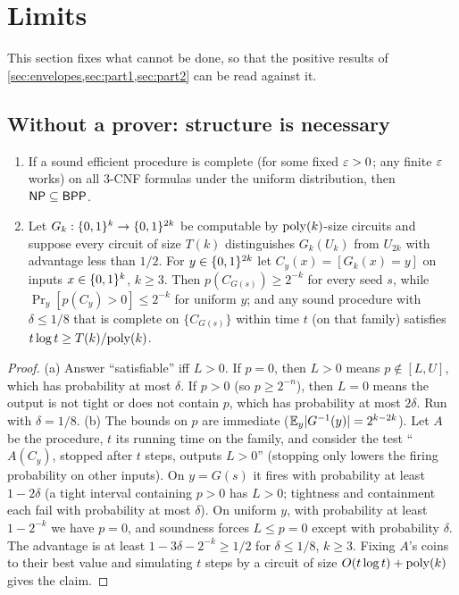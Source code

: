 \section{Limits}\label{sec:limits}

This section fixes what cannot be done, so that the positive results of
\cref{sec:envelopes,sec:part1,sec:part2} can be read against it.

\subsection{Without a prover: structure is necessary}

\begin{proposition}\label{prop:worstcase}
\begin{enumerate}[label=(\alph*)]
\item If a sound efficient procedure is complete (for some fixed $\varepsilon>0$; any
finite $\varepsilon$ works) on all 3-CNF formulas under the uniform distribution, then
$\mathsf{NP}\subseteq\mathsf{BPP}$.
\item Let $G_k:\{0,1\}^k\to\{0,1\}^{2k}$ be computable by $\mathrm{poly}(k)$-size
circuits and suppose every circuit of size $T(k)$ distinguishes $G_k(U_k)$
from $U_{2k}$ with advantage less than $1/2$. For $y\in\{0,1\}^{2k}$ let
$C_y(x)=[G_k(x)=y]$ on inputs $x\in\{0,1\}^k$, $k\ge3$. Then $p(C_{G(s)})\ge 2^{-k}$ for
every seed $s$, while $\Pr_y[p(C_y)>0]\le2^{-k}$ for uniform $y$; and any
sound procedure with $\delta\le1/8$ that is complete on $\{C_{G(s)}\}$ within
time $t$ (on that family) satisfies $t\log t\ge T(k)/\mathrm{poly}(k)$.
\end{enumerate}
\end{proposition}

\begin{proof}
(a) Answer ``satisfiable'' iff $L>0$. If $p=0$, then $L>0$ means $p\notin[L,U]$,
which has probability at most $\delta$. If $p>0$ (so $p\ge2^{-n}$), then $L=0$
means the output is not tight or does not contain $p$, which has probability at
most $2\delta$. Run with $\delta=1/8$.
(b) The bounds on $p$ are immediate ($\mathbb{E}_y|G^{-1}(y)|=2^{k-2k}$). Let $A$ be
the procedure, $t$ its running time on the family, and consider the test
``$A(C_y)$, stopped after $t$ steps, outputs $L>0$'' (stopping only lowers the
firing probability on other inputs). On $y=G(s)$ it fires with probability at
least $1-2\delta$ (a tight interval containing $p>0$ has $L>0$; tightness and
containment each fail with probability at most $\delta$). On uniform $y$, with
probability at least $1-2^{-k}$ we have $p=0$, and soundness forces $L\le p=0$
except with probability $\delta$. The advantage is at least
$1-3\delta-2^{-k}\ge1/2$ for $\delta\le1/8$, $k\ge3$. Fixing $A$'s coins to their
best value and simulating $t$ steps by a circuit of size $O(t\log t)+\mathrm{poly}(k)$
gives the claim.
\end{proof}

